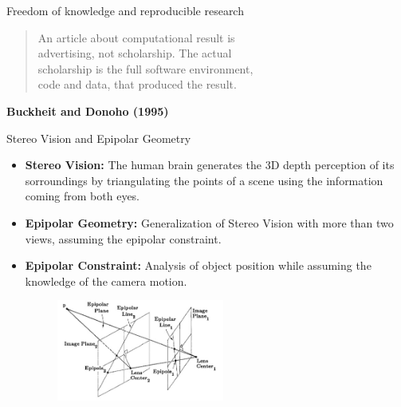 \begin{frame}{Freedom of knowledge and reproducible research}

\begin{quote}
An article about computational result is \\
advertising, not scholarship. The actual \\
scholarship is the full software environment,\\
code and data, that produced the result.
\end{quote}
\begin{flushright}
\textbf{Buckheit and Donoho (1995)}
\end{flushright}
\end{frame}

\begin{frame}{Stereo Vision and Epipolar Geometry}
\begin{block}{}
\begin{itemize}
\item \textbf{Stereo Vision:} The human brain generates the 3D depth perception of its sorroundings by triangulating the points of a scene using the information coming from both eyes.

\pause
\item \textbf{Epipolar Geometry:} Generalization of Stereo Vision with more than two views, assuming the epipolar constraint.

\pause
\item \textbf{Epipolar Constraint:} Analysis of object position while assuming the knowledge of the camera motion.
\pause
\begin{figure}[h!]
\centering
\includegraphics[width=0.52\textwidth]{../../Diagrams/epipolarline.jpg}
\end{figure}
 
\end{itemize}
\end{block}
\end{frame}

